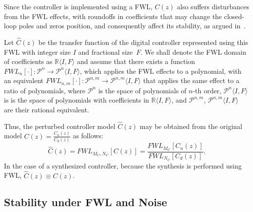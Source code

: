 \documentclass{sig-alternate-05-2015}
\begin{document}
Since the controller is implemented using a FWL, $C(z)$ also suffers
disturbances from the FWL effects, with roundoffs in coefficients that may
change the closed-loop poles and zeros position, and consequently affect its
stability, as argued in~\cite{Bessa16}.

Let $\hat{C}(z)$ be the transfer function of the digital controller
represented using this FWL with integer size $I$ and fractional size~$F$. 
We shall denote the FWL domain of coefficients as $\mathbb{R}\langle I,F
\rangle$
%
%
and assume that there exists a function
$\mathit{FWL}_n[\cdot]:\mathcal{P}^{n}\rightarrow \mathcal{P}^{n}\langle I,F \rangle$,
which applies the FWL effects to a polynomial, with an equivalent $\mathit{FWL}_{n,m}[\cdot]:\mathcal{P}^{n,m}\rightarrow \mathcal{P}^{n,m}\langle I,F \rangle$ that applies the same effect to a ratio of polynomials, where
$\mathcal{P}^{n}$ is the
space of polynomials of $n$-th order, $\mathcal{P}^{n}\langle I,F
\rangle$ is is the space of polynomials with coefficients in
$\mathbb{R}\langle I,F \rangle$, and $\mathcal{P}^{n,m}$,  $\mathcal{P}^{n,m}\langle I,F
\rangle$ are their rational equivalent.

Thus, the perturbed controller model $\hat{C}(z)$ may be obtained from the
original model $C(z)=\frac{C_{n}(z)}{C_{d}(z)}$ as follows:
%
\begin{equation}
\hat{C}(z)=\mathit{FWL}_{M_C,N_C}[C(z)]=\frac{\mathit{FWL}_{M_C}[C_n(z)]}{\mathit{FWL}_{N_C}[C_d(z)]}.
\end{equation}
%
In the case of a synthesized controller, because the synthesis is performed
using FWL, $\hat{C}(z) \equiv C(z)$.

%

\subsection{Stability under FWL and Noise}
\label{sec:stability}
\end{document}
